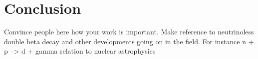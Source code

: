 \cleardoublepage
\chapter{Conclusion}

	Convince people here how your work is important. Make reference to neutrinoless
	double beta decay and other developments going on in the field. For instance
	n + p --> d + gamma relation to nuclear astrophysics